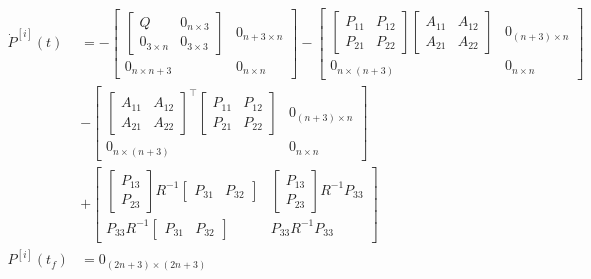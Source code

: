 \documentclass[3p,times]{article}
\begin{document}
\begin{align}
\dot{P}^{[i]}(t) &= -\begin{bmatrix}
\begin{bmatrix} Q & 0_{n\times 3} \\ 0_{3\times n} & 0_{3 \times 3}\end{bmatrix} & 0_{n+3\times n} \\ 0_{n\times n+3} & 0_{n\times n}
\end{bmatrix}
-\begin{bmatrix}\begin{bmatrix}
P_{11} & P_{12} \\
P_{21} & P_{22}
\end{bmatrix}\begin{bmatrix}
A_{11} & A_{12} \\ A_{21} & A_{22} 
\end{bmatrix}   & 0_{(n+3)\times n} \\ 
0_{n \times (n+3)} & 0_{n \times n}\end{bmatrix} \\
&-\begin{bmatrix} \begin{bmatrix}
A_{11} & A_{12} \\ A_{21} & A_{22} 
\end{bmatrix}^{\top}\begin{bmatrix}
P_{11} & P_{12} \\
P_{21} & P_{22}
\end{bmatrix}  & 0_{(n+3)\times n} \\ 
0_{n \times (n+3)} & 0_{n \times n}\end{bmatrix}\\ 
&+\begin{bmatrix}
\begin{bmatrix}
P_{13} \\ P_{23}
\end{bmatrix}
R^{-1} 
\begin{bmatrix}
P_{31} & P_{32}
\end{bmatrix}
&
\begin{bmatrix}
P_{13} \\ P_{23}
\end{bmatrix}R^{-1} P_{33} \\
P_{33}R^{-1}\begin{bmatrix}
P_{31} & P_{32}
\end{bmatrix} & P_{33}R^{-1}P_{33}
\end{bmatrix}
\\
P^{[i]}(t_f) &= 0_{(2n+3)\times(2n+3)}
\end{align}
\end{document}
